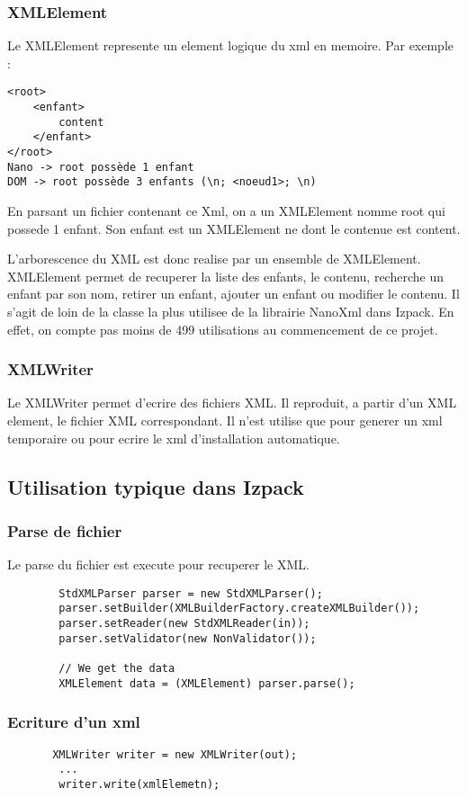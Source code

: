 \subsubsection{XMLElement}
Le XMLElement represente un element logique du xml en memoire. Par exemple :
\begin{verbatim}
<root>
	<enfant>
		content
	</enfant>
</root>
Nano -> root possède 1 enfant
DOM -> root possède 3 enfants (\n; <noeud1>; \n)
\end{verbatim}
En parsant un fichier contenant ce Xml, on a un XMLElement nomme root qui possede 1 enfant. Son enfant est un XMLElement ne dont le contenue est content.

L'arborescence du XML est donc realise par un ensemble de XMLElement. XMLElement permet de recuperer la liste des enfants, le contenu, recherche un enfant par son nom, retirer un enfant, ajouter un enfant ou modifier le contenu. Il s'agit de loin de la classe la plus utilisee de la librairie NanoXml dans Izpack. En effet, on compte pas moins de 499 utilisations au commencement de ce projet.
\subsubsection{XMLWriter}
Le XMLWriter permet d'ecrire des fichiers XML. Il reproduit, a partir d'un XML element, le fichier XML correspondant. Il n'est utilise que pour generer un xml temporaire ou pour ecrire le xml d'installation automatique. 
\subsection{Utilisation typique dans Izpack}
\subsubsection{Parse de fichier}
Le parse du fichier est execute pour recuperer le XML.
\begin{verbatim}
        StdXMLParser parser = new StdXMLParser();
        parser.setBuilder(XMLBuilderFactory.createXMLBuilder());
        parser.setReader(new StdXMLReader(in));
        parser.setValidator(new NonValidator());

        // We get the data
        XMLElement data = (XMLElement) parser.parse();
\end{verbatim}
\subsubsection{Ecriture d'un xml}
\begin{verbatim}
       XMLWriter writer = new XMLWriter(out);
        ...
        writer.write(xmlElemetn);
\end{verbatim}

